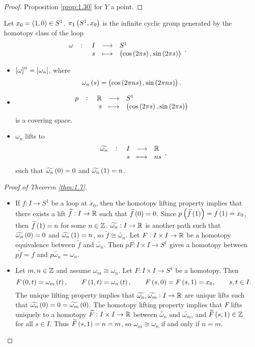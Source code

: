 \begin{proof}
Proposition \ref{prop:1.30} for $ Y $ a point.
\end{proof}

\begin{theorem}
\label{thm:1.7}
Let $ x_0 = \br{1, 0} \in S^1 $. $ \pi_1\br{S^1, x_0} $ is the infinite cyclic group generated by the homotopy class of the loop
$$ \function[\omega]{I}{S^1}{s}{\br{\cos\br{2\pi s}, \sin\br{2\pi s}}}. $$
\end{theorem}

\begin{remark*}
\hfill
\begin{itemize}
\item $ \sbr{\omega}^n = \sbr{\omega_n} $, where
$$ \omega_n\br{s} = \br{\cos\br{2\pi ns}, \sin\br{2\pi ns}}. $$
\item
$$ \function[p]{\R}{S^1}{s}{\br{\cos\br{2\pi s}, \sin\br{2\pi s}}} $$
is a covering space.
\item $ \omega_n $ lifts to
$$ \function[\widetilde{\omega_n}]{I}{\R}{s}{ns}, $$
such that $ \widetilde{\omega_n}\br{0} = 0 $ and $ \widetilde{\omega_n}\br{1} = n $.
\end{itemize}
\end{remark*}

\begin{proof}[Proof of Theorem \ref{thm:1.7}]
\hfill
\begin{itemize}
\item If $ f : I \to S^1 $ be a loop at $ x_0 $, then the homotopy lifting property implies that there exists a lift $ \widetilde{f} : I \to \mathbb{R} $ such that $ \widetilde{f}\br{0} = 0 $. Since $ p\br{\widetilde{f}\br{1}} = f\br{1} = x_0 $, then $ \widetilde{f}\br{1} = n $ for some $ n \in \mathbb{Z} $. $ \widetilde{\omega_n} : I \to \mathbb{R} $ is another path such that $ \widetilde{\omega_n}\br{0} = 0 $ and $ \widetilde{\omega_n}\br{1} = n $, so $ \widetilde{f} \cong \widetilde{\omega_n} $. Let $ F : I \times I \to \mathbb{R} $ be a homotopy equivalence between $ \widetilde{f} $ and $ \widetilde{\omega_n} $. Then $ pF : I \times I \to S^1 $ gives a homotopy between $ p\widetilde{f} = f $ and $ p\widetilde{\omega_n} = \omega_n $.
\item Let $ m, n \in \mathbb{Z} $ and assume $ \omega_m \cong \omega_n $. Let $ F : I \times I \to S^1 $ be a homotopy. Then
$$ F\br{0, t} = \omega_m\br{t}, \qquad F\br{1, t} = \omega_n\br{t}, \qquad F\br{s, 0} = F\br{s, 1} = x_0, \qquad s, t \in I. $$
The unique lifting property implies that $ \widetilde{\omega_n}, \widetilde{\omega_m} : I \to \mathbb{R} $ are unique lifts such that $ \widetilde{\omega_n}\br{0} = 0 = \widetilde{\omega_m}\br{0} $. The homotopy lifting property implies that $ F $ lifts uniquely to a homotopy $ \widetilde{F} : I \times I \to \mathbb{R} $ between $ \widetilde{\omega_n} $ and $ \widetilde{\omega_m} $, and $ \widetilde{F}\br{s, 1} \in \Z $ for all $ s \in I $. Thus $ \widetilde{F}\br{s, 1} = n = m $, so $ \omega_m \cong \omega_n $ if and only if $ n = m $.
\end{itemize}
\end{proof}

